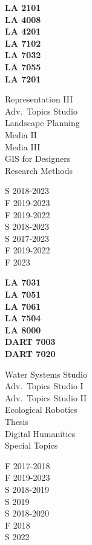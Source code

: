 \documentclass[10pt]{developercv} %
\begin{document}
\begin{minipage}[t]{0.1\textwidth} 
\textbf{LA 2101}\\
\textbf{LA 4008}\\
\textbf{LA 4201}\\
\textbf{LA 7102}\\
\textbf{LA 7032}\\
\textbf{LA 7055}\\
\textbf{LA 7201}\\
\end{minipage}
\begin{minipage}[t]{0.2\textwidth} 
Representation III\\
Adv.~Topics Studio\\
Landscape Planning \\
Media II \\
Media III\\
GIS for Designers\\
Research Methods\\
\end{minipage}
\begin{minipage}[t]{0.15\textwidth} 
S 2018-2023\\
F 2019-2023\\
F 2019-2022\\
S 2018-2023\\
S 2017-2023\\
F 2019-2022\\
F 2023\\
\end{minipage}
\begin{minipage}[t]{0.15\textwidth} 
\textbf{LA 7031}\\
\textbf{LA 7051}\\
\textbf{LA 7061}\\
\textbf{LA 7504}\\
\textbf{LA 8000}\\
\textbf{DART 7003}\\
\textbf{DART 7020}\\
\end{minipage}
\begin{minipage}[t]{0.25\textwidth} 
Water Systems Studio\\
Adv.~Topics Studio I\\
Adv.~Topics Studio II\\
Ecological Robotics\\
Thesis\\
Digital Humanities\\
Special Topics\\
\end{minipage}
\begin{minipage}[t]{0.15\textwidth} 
F 2017-2018\\
F 2019-2023\\
S 2018-2019\\
S 2019\\
S 2018-2020\\
F 2018\\
S 2022\\
\end{minipage}
\end{document}
